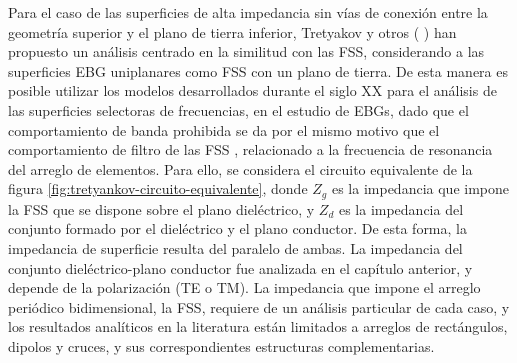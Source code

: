 
Para el caso de las superficies de alta impedancia sin vías de conexión entre la geometría superior y el plano de tierra inferior, Tretyakov y otros (\cite{Tretyakov:AnalyticalModeling} \cite{Yakovlev:AnalyticalModelingHIS}) han propuesto un análisis centrado en la similitud con las FSS, considerando a las superficies EBG uniplanares como FSS con un plano de tierra. De esta manera es posible utilizar los modelos desarrollados durante el siglo \textsc{XX} para el análisis de las superficies selectoras de frecuencias, en el estudio de EBGs, dado que el comportamiento de banda prohibida se da por el mismo motivo que el comportamiento de filtro de las FSS \cite{Goussetis:TailoringAMCEBGCharacteristics}, relacionado a la frecuencia de resonancia del arreglo de elementos. Para ello, se considera el circuito equivalente de la figura \ref{fig:tretyankov-circuito-equivalente}, donde $Z_g$ es la impedancia que impone la FSS que se dispone sobre el plano dieléctrico, y $Z_d$ es la impedancia del conjunto formado por el dieléctrico y el plano conductor. De esta forma, la impedancia de superficie resulta del paralelo de ambas. La impedancia del conjunto dieléctrico-plano conductor fue analizada en el capítulo anterior, y depende de la polarización (TE o TM). La impedancia que impone el arreglo periódico bidimensional, la FSS, requiere de un análisis particular de cada caso, y los resultados analíticos en la literatura están limitados a arreglos de rectángulos, dipolos y cruces, y sus correspondientes estructuras complementarias.

